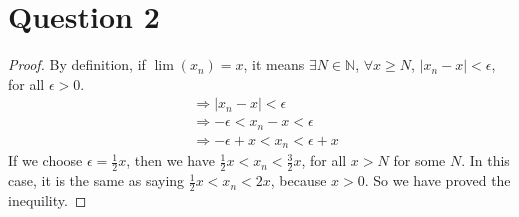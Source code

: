 \documentclass[12pt]{article}
\begin{document}
\newpage
\section*{Question 2}

\begin{proof}
By definition, if 
$\lim(x_n) = x$, it means 
$\exists N \in \mathbb{N}$, $\forall 
x \geq N$, $\vert x_n - x \vert < \epsilon$, for all
$\epsilon > 0$.
\begin{align*}
    &\Longrightarrow \vert x_n - x \vert < \epsilon \\
    &\Longrightarrow -\epsilon < x_n - x < \epsilon \\
    &\Longrightarrow -\epsilon+x < x_n < \epsilon+ x
\end{align*}
If we choose $\displaystyle{\epsilon = \frac{1}{2}x}$, then we have
$ \displaystyle{\frac{1}{2}x < x_n < \frac{3}{2}x}$, for all
$ x > N$ for some $N$. In this case, it is the same as saying
$\displaystyle{\frac{1}{2}x < x_n < 2x}$, because 
$x>0$. So we have proved the
inequility.




\end{proof}
\end{document}
